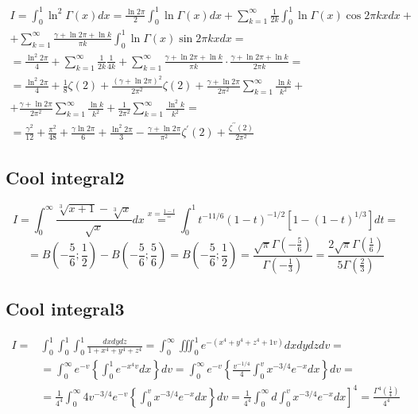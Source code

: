 	$$
	\begin{gathered}
		I=\int_0^1 \ln ^2 \Gamma(x) d x=\frac{\ln 2 \pi}{2} \int_0^1 \ln \Gamma(x) d x+\sum_{k=1}^{\infty} \frac{1}{2 k} \int_0^1 \ln \Gamma(x) \cos 2 \pi k x d x+ \\
		+\sum_{k=1}^{\infty} \frac{\gamma+\ln 2 \pi+\ln k}{\pi k} \int_0^1 \ln \Gamma(x) \sin 2 \pi k x d x= \\
		=\frac{\ln ^2 2 \pi}{4}+\sum_{k=1}^{\infty} \frac{1}{2 k} \frac{1}{4 k}+\sum_{k=1}^{\infty} \frac{\gamma+\ln 2 \pi+\ln k}{\pi k} \cdot \frac{\gamma+\ln 2 \pi+\ln k}{2 \pi k}= \\
		=\frac{\ln ^2 2 \pi}{4}+\frac{1}{8} \zeta(2)+\frac{(\gamma+\ln 2 \pi)^2}{2 \pi^2} \zeta(2)+\frac{\gamma+\ln 2 \pi}{2 \pi^2} \sum_{k=1}^{\infty} \frac{\ln k}{k^2}+ \\
		+\frac{\gamma+\ln 2 \pi}{2 \pi^2} \sum_{k=1}^{\infty} \frac{\ln k}{k^2}+\frac{1}{2 \pi^2} \sum_{k=1}^{\infty} \frac{\ln ^2 k}{k^2}= \\
		=\frac{\gamma^2}{12}+\frac{\pi^2}{48}+\frac{\gamma \ln 2 \pi}{6}+\frac{\ln ^2 2 \pi}{3}-\frac{\gamma+\ln 2 \pi}{\pi^2} \zeta^{\prime}(2)+\frac{\zeta^{\prime \prime}(2)}{2 \pi^2}
	\end{gathered}
	$$
	
	\subsection{Cool integral2}
	
	$$
	I=\int_0^{\infty} \frac{\sqrt[3]{x+1}-\sqrt[3]{x}}{\sqrt{x}} d x \stackrel{x=\frac{1-t}{=}}{=} \int_0^1 t^{-11 / 6}(1-t)^{-1 / 2}\left[1-(1-t)^{1 / 3}\right] d t=
	$$
	$$=B(-\frac{5}{6}; \frac{1}{2})-B(-\frac{5}{6}; \frac{5}{6}) = B(-\frac{5}{6}; \frac{1}{2}) = \frac{\sqrt{\pi}\Gamma(-\frac{5}{6})}{\Gamma(-\frac{1}{3})}
	=\frac{2 \sqrt{\pi} \Gamma\left(\frac{1}{6}\right)}{5 \Gamma\left(\frac{2}{3}\right)} $$
	
	\subsection{Cool integral3}
	
	$$
	\begin{aligned}
		I= & \int_0^1 \int_0^1 \int_0^1 \frac{d x d y d z}{1+x^4+y^4+z^4}=\int_0^{\infty} \iiint_0^1 e^{-\left(x^4+y^4+z^4+1 v\right)} d x d y d z d v= \\
		& =\int_0^{\infty} e^{-v}\left\{\int_0^1 e^{-x^4 v} d x\right\} d v=\int_0^{\infty} e^{-v}\left\{\frac{v^{-1 / 4}}{4} \int_0^v x^{-3 / 4} e^{-x} d x\right\} d v= \\
		& \left.=\frac{1}{4^4} \int_0^{\infty} 4 v^{-3 / 4} e^{-v}\left\{\int_0^v x^{-3 / 4} e^{-x} d x\right\} d v=\frac{1}{4^4} \int_0^{\infty} d \int_0^v x^{-3 / 4} e^{-x} d x\right]^4=\frac{\Gamma^4\left(\frac{1}{4}\right)}{4^4}
	\end{aligned}
	$$
	
